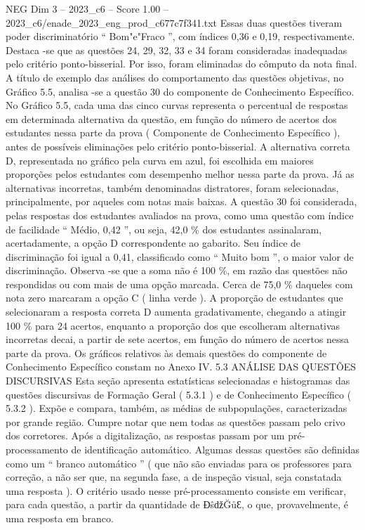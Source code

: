 \begin{textsample}{NEG Dim 3 – 2023\_c6 – Score 1.00 – 2023\_c6/enade\_2023\_eng\_prod\_c677c7f341.txt}
Essas duas questões tiveram poder discriminatório “ Bom"e"Fraco ”, com índices 0,36 e 0,19, respectivamente.
Destaca -se que as questões 24, 29, 32, 33 e 34 foram consideradas inadequadas pelo critério ponto-bisserial.
Por isso, foram eliminadas do cômputo da nota final.
A título de exemplo das análises do comportamento das questões objetivas, no Gráfico 5.5, analisa -se a questão 30 do componente de Conhecimento Específico.
No Gráfico 5.5, cada uma das cinco curvas representa o percentual de respostas em determinada alternativa da questão, em função do número de acertos dos estudantes nessa parte da prova ( Componente de Conhecimento Específico ), antes de possíveis eliminações pelo critério ponto-bisserial.
A alternativa correta D, representada no gráfico pela curva em azul, foi escolhida em maiores proporções pelos estudantes com desempenho melhor nessa parte da prova.
Já as alternativas incorretas, também denominadas distratores, foram selecionadas, principalmente, por aqueles com notas mais baixas.
A questão 30 foi considerada, pelas respostas dos estudantes avaliados na prova, como uma questão com índice de facilidade “ Médio, 0,42 ”, ou seja, 42,0 \% dos estudantes assinalaram, acertadamente, a opção D correspondente ao gabarito.
Seu índice de discriminação foi igual a 0,41, classificado como “ Muito bom ”, o maior valor de discriminação.
Observa -se que a soma não é 100 \%, em razão das questões não respondidas ou com mais de uma opção marcada.
Cerca de 75,0 \% daqueles com nota zero marcaram a opção C ( linha verde ).
A proporção de estudantes que selecionaram a resposta correta D aumenta gradativamente, chegando a atingir 100 \% para 24 acertos, enquanto a proporção dos que escolheram alternativas incorretas decai, a partir de sete acertos, em função do número de acertos nessa parte da prova.
Os gráficos relativos às demais questões do componente de Conhecimento Específico constam no Anexo IV. 5.3 ANÁLISE DAS QUESTÕES DISCURSIVAS Esta seção apresenta estatísticas selecionadas e histogramas das questões discursivas de Formação Geral ( 5.3.1 ) e de Conhecimento Específico ( 5.3.2 ).
Expõe e compara, também, as médias de subpopulações, caracterizadas por grande região.
Cumpre notar que nem todas as questões passam pelo crivo dos corretores.
Após a digitalização, as respostas passam por um pré-processamento de identificação automático.
Algumas dessas questões são definidas como um “ branco automático ” ( que não são enviadas para os professores para correção, a não ser que, na segunda fase, a de inspeção visual, seja constatada uma resposta ).
O critério usado nesse pré-processamento consiste em verificar, para cada questão, a partir da quantidade de ƉŝǆĞůƐ, o que, provavelmente, é uma resposta em branco.

\end{textsample}
